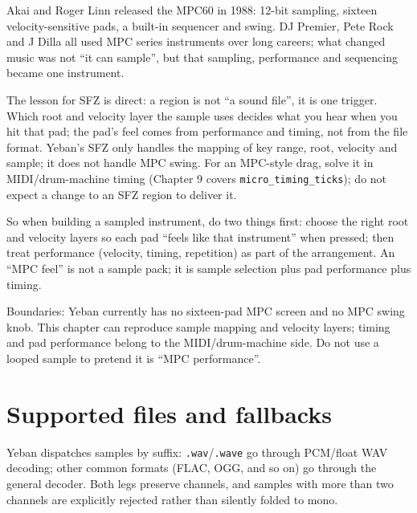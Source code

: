 Akai and Roger Linn released the MPC60 in 1988: 12-bit sampling, sixteen velocity-sensitive pads, a built-in sequencer and swing. DJ Premier, Pete Rock and J Dilla all used MPC series instruments over long careers; what changed music was not ``it can sample'', but that sampling, performance and sequencing became one instrument.

The lesson for SFZ is direct: a region is not ``a sound file'', it is one trigger. Which root and velocity layer the sample uses decides what you hear when you hit that pad; the pad's feel comes from performance and timing, not from the file format. Yeban's SFZ only handles the mapping of key range, root, velocity and sample; it does not handle MPC swing. For an MPC-style drag, solve it in MIDI/drum-machine timing (Chapter 9 covers \texttt{micro\_timing\_ticks}); do not expect a change to an SFZ region to deliver it.

So when building a sampled instrument, do two things first: choose the right root and velocity layers so each pad ``feels like that instrument'' when pressed; then treat performance (velocity, timing, repetition) as part of the arrangement. An ``MPC feel'' is not a sample pack; it is sample selection plus pad performance plus timing.

Boundaries: Yeban currently has no sixteen-pad MPC screen and no MPC swing knob. This chapter can reproduce sample mapping and velocity layers; timing and pad performance belong to the MIDI/drum-machine side. Do not use a looped sample to pretend it is ``MPC performance''.

\section{Supported files and fallbacks}

Yeban dispatches samples by suffix: \texttt{.wav}/\texttt{.wave} go through PCM/float WAV decoding; other common formats (FLAC, OGG, and so on) go through the general decoder. Both legs preserve channels, and samples with more than two channels are explicitly rejected rather than silently folded to mono.

